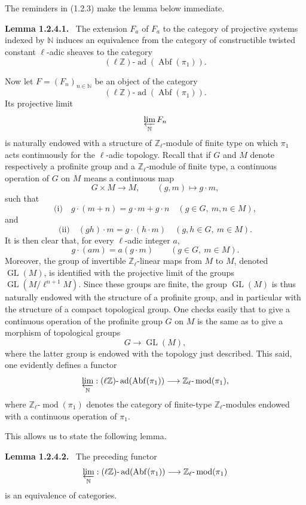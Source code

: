 \documentclass[11pt]{article}
\newenvironment{statement}[1]{\par\medskip\noindent\textbf{#1.}\ }{\par\medskip}
\providecommand{\Abf}{\operatorname{Abf}}
\providecommand{\GL}{\operatorname{GL}}
\providecommand{\ad}{\operatorname{ad}}
\providecommand{\modn}{\operatorname{mod}}
\begin{document}
The reminders in (1.2.3) make the lemma below immediate.

\begin{statement}{Lemma 1.2.4.1}
The extension \(\widehat F_a\) of \(F_a\) to the category of projective systems indexed by \(\mathbb N\) induces an equivalence from the category of constructible twisted constant \(\ell\)-adic sheaves to the category
\[
(\ell\mathbb Z)\text{-}\ad(\Abf(\pi_1)).
\]
\end{statement}

Now let \(F=(F_n)_{n\in\mathbb N}\) be an object of the category
\[
(\ell\mathbb Z)\text{-}\ad(\Abf(\pi_1)).
\]
Its projective limit
\[
\varprojlim_{\mathbb N}F_n
\]
is naturally endowed with a structure of \(\mathbb Z_\ell\)-module of finite type on which \(\pi_1\) acts continuously for the \(\ell\)-adic topology. Recall that if \(G\) and \(M\) denote respectively a profinite group and a \(\mathbb Z_\ell\)-module of finite type, a continuous operation of \(G\) on \(M\) means a continuous map
\[
G\times M\longrightarrow M,\qquad (g,m)\longmapsto g\cdot m,
\]
such that
\[
\text{(i)}\quad g\cdot(m+n)=g\cdot m+g\cdot n\quad (g\in G,\ m,n\in M),
\]
and
\[
\text{(ii)}\quad (gh)\cdot m=g\cdot(h\cdot m)\quad (g,h\in G,\ m\in M).
\]
It is then clear that, for every \(\ell\)-adic integer \(a\),
\[
g\cdot(am)=a(g\cdot m)\qquad (g\in G,\ m\in M).
\]
Moreover, the group of invertible \(\mathbb Z_\ell\)-linear maps from \(M\) to \(M\), denoted \(\GL(M)\), is identified with the projective limit of the groups \(\GL(M/\ell^{n+1}M)\). Since these groups are finite, the group \(\GL(M)\) is thus naturally endowed with the structure of a profinite group, and in particular with the structure of a compact topological group. One checks easily that to give a continuous operation of the profinite group \(G\) on \(M\) is the same as to give a morphism of topological groups
\[
G\longrightarrow \GL(M),
\]
where the latter group is endowed with the topology just described. This said, one evidently defines a functor
\[
\varprojlim_{\mathbb N}:(\ell\mathbb Z)\text{-}\ad(\Abf(\pi_1))\longrightarrow
\mathbb Z_\ell\text{-}\modn(\pi_1),
\]
where \(\mathbb Z_\ell\text{-}\modn(\pi_1)\) denotes the category of finite-type \(\mathbb Z_\ell\)-modules endowed with a continuous operation of \(\pi_1\).

This allows us to state the following lemma.

\begin{statement}{Lemma 1.2.4.2}
The preceding functor
\[
\varprojlim_{\mathbb N}:(\ell\mathbb Z)\text{-}\ad(\Abf(\pi_1))
\longrightarrow \mathbb Z_\ell\text{-}\modn(\pi_1)
\]
is an equivalence of categories.
\end{statement}
\end{document}
